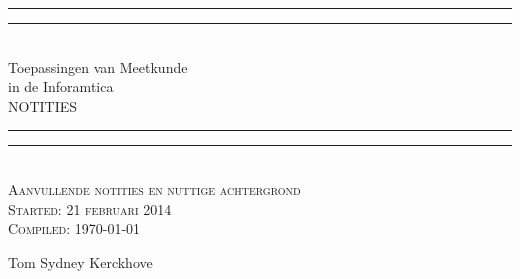 \documentclass[tmi_notities.tex]{subfiles}
\begin{document}
\centering
\vspace*{\baselineskip}

\rule{\textwidth}{1.6pt}\vspace*{-\baselineskip}\vspace*{2pt}
\rule{\textwidth}{0.4pt}\\[\baselineskip]

{\Huge Toepassingen van Meetkunde\\in de Inforamtica \\[0.6\baselineskip] NOTITIES}\\[0.2\baselineskip]

\rule{\textwidth}{0.4pt}\vspace*{-\baselineskip}\vspace{3.2pt}
\rule{\textwidth}{1.6pt}\\[\baselineskip]

\scshape
Aanvullende notities en nuttige achtergrond\\[\baselineskip]

Started: 21 februari 2014\\
Compiled: \today

\vspace*{2\baselineskip}

{\Large Tom Sydney Kerckhove}

\vfill
\end{document}

